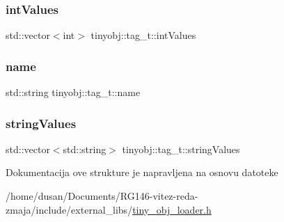 \subsubsection{\texorpdfstring{int\+Values}{intValues}}
{\footnotesize\ttfamily std\+::vector$<$int$>$ tinyobj\+::tag\+\_\+t\+::int\+Values}

\mbox{\label{structtinyobj_1_1tag__t_a9b3650154d2fbd83dad945ebcf6bd448}} 
\subsubsection{\texorpdfstring{name}{name}}
{\footnotesize\ttfamily std\+::string tinyobj\+::tag\+\_\+t\+::name}

\mbox{\label{structtinyobj_1_1tag__t_a25634eea923961fd5b2520ea782397e8}} 
\subsubsection{\texorpdfstring{string\+Values}{stringValues}}
{\footnotesize\ttfamily std\+::vector$<$std\+::string$>$ tinyobj\+::tag\+\_\+t\+::string\+Values}



Dokumentacija ove strukture je napravljena na osnovu datoteke \begin{DoxyCompactItemize}
\item 
/home/dusan/\+Documents/\+R\+G146-\/vitez-\/reda-\/zmaja/include/external\+\_\+libs/\hyperlink{tiny__obj__loader_8h}{tiny\+\_\+obj\+\_\+loader.\+h}\end{DoxyCompactItemize}
